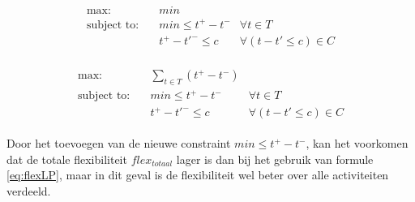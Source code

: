 \begin{align}
\label{eq:flexfirstLP}
\begin{aligned}
        \text{max:}& \quad min & \\
 \text{subject to:}& \quad min \leq t^+ - t^- & \forall t \in T \\
                   & \quad t^+ - t'^- \leq c & \forall (t - t' \leq c) \in C
\end{aligned}
\end{align}

\begin{align}
\label{eq:flexsecondLP}
\begin{aligned}
        \text{max:}& \quad \sum_{t \in T} (t^+ - t^-) & \\
 \text{subject to:}& \quad min \leq t^+ - t^- & \forall t \in T \\
                   & \quad t^+ - t'^- \leq c & \forall (t - t' \leq c) \in C
\end{aligned}
\end{align}

Door het toevoegen van de nieuwe constraint $min \leq t^+ - t^-$, kan het voorkomen dat de totale flexibiliteit $flex_{totaal}$ lager is dan bij het gebruik van formule \ref{eq:flexLP}, maar in dit geval is de flexibiliteit wel beter over alle activiteiten verdeeld.
